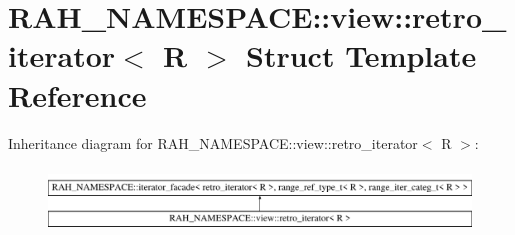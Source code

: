 \hypertarget{struct_r_a_h___n_a_m_e_s_p_a_c_e_1_1view_1_1retro__iterator}{}\section{R\+A\+H\+\_\+\+N\+A\+M\+E\+S\+P\+A\+CE\+::view\+::retro\+\_\+iterator$<$ R $>$ Struct Template Reference}
\label{struct_r_a_h___n_a_m_e_s_p_a_c_e_1_1view_1_1retro__iterator}
Inheritance diagram for R\+A\+H\+\_\+\+N\+A\+M\+E\+S\+P\+A\+CE\+::view\+::retro\+\_\+iterator$<$ R $>$\+:\begin{figure}[H]
\begin{center}
\leavevmode
\includegraphics[height=1.752739cm]{struct_r_a_h___n_a_m_e_s_p_a_c_e_1_1view_1_1retro__iterator}
\end{center}
\end{figure}
